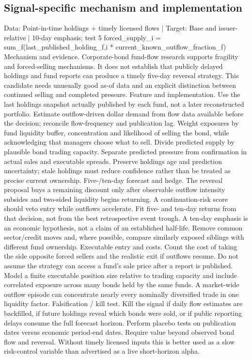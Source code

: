 \documentclass[10pt]{article}
\begin{document}
\subsection{Signal-specific mechanism and implementation}
Data: Point-in-time holdings + timely licensed flows  |  Target: Base and issuer-relative  |  10-day emphasis; test 5 forced\_supply\_i = sum\_f(last\_published\_holding\_f,i * current\_known\_outflow\_fraction\_f) Mechanism and evidence.  Corporate-bond fund-flow research supports fragility and forced-selling mechanisms. It does not establish that publicly delayed holdings and fund reports can produce a timely five-day reversal strategy. This candidate needs unusually good as-of data and an explicit distinction between continued selling and completed pressure. Feature and implementation.  Use the last holdings snapshot actually published by each fund, not a later reconstructed portfolio. Estimate outflow-driven dollar demand from flow data available before the decision; reconcile flow-frequency and publication lag. Weight exposures by fund liquidity buffer, concentration and likelihood of selling the bond, while acknowledging that managers choose what to sell. Divide predicted supply by plausible bond trading capacity. Separate predicted pressure from confirmation in actual sales and executable spreads. Preserve holdings age and prediction uncertainty; stale holdings must reduce confidence rather than be treated as precise current ownership. Five-/ten-day forecast and hedge.  The reversal proposal buys a remaining discount only after observable outflow intensity subsides and two-sided liquidity begins returning. A continuation-risk score should veto entry while outflows accelerate. Fit five- and ten-day returns from that decision, not from the best retrospective event trough. A ten-day emphasis is an economic hypothesis, not a claim of an established half-life. Remove common sector/credit moves and, where possible, compare similarly exposed siblings with different fund ownership. Executable entry and costs.  Count the cost of taking the side opposite forced sellers and the realistic exit if outflows resume. Do not assume the strategy can access a fund’s sale price after a report is published. Model a finite executable position size relative to trading capacity and include correlated exposure across many bonds held by the same funds. A market-wide outflow episode can concentrate nearly every nominally diversified trade in one liquidity factor. Falsification / kill test.  Kill the signal if daily flow estimates are backfilled, if future holdings reveal which bonds were sold, or if public reporting delays consume the full forecast horizon. Perform placebo tests on publication dates versus economic period-end dates. Require value beyond observed bond flow and reversal. Without timely licensed inputs this is better used as a slow risk-control variable than advertised as a live short-horizon alpha.
\end{document}
